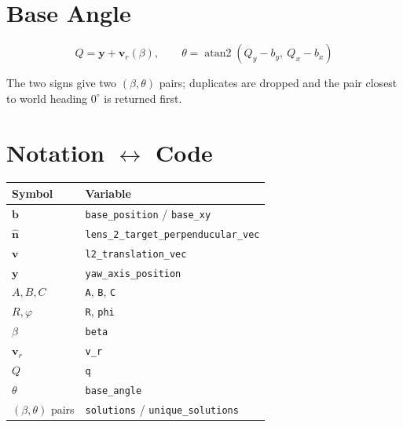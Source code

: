 \documentclass[11pt,a4paper]{article}
\begin{document}
\section{Base Angle}

\begin{equation}
Q = \mathbf y + \mathbf v_r(\beta), \qquad
\theta = \operatorname{atan2}(Q_y - b_y,\ Q_x - b_x)
\end{equation}

The two signs give two $(\beta,\theta)$ pairs; duplicates are dropped and the pair closest to
world heading $0^\circ$ is returned first.

\section{Notation $\leftrightarrow$ Code}

\begin{center}
\begin{tabular}{@{}ll@{}}
\toprule
Symbol & Variable \\
\midrule
$\mathbf b$ & \texttt{base\_position} / \texttt{base\_xy} \\
$\hat{\mathbf n}$ & \texttt{lens\_2\_target\_perpenducular\_vec} \\
$\mathbf v$ & \texttt{l2\_translation\_vec} \\
$\mathbf y$ & \texttt{yaw\_axis\_position} \\
$A,B,C$ & \texttt{A}, \texttt{B}, \texttt{C} \\
$R,\varphi$ & \texttt{R}, \texttt{phi} \\
$\beta$ & \texttt{beta} \\
$\mathbf v_r$ & \texttt{v\_r} \\
$Q$ & \texttt{q} \\
$\theta$ & \texttt{base\_angle} \\
$(\beta,\theta)$ pairs & \texttt{solutions} / \texttt{unique\_solutions} \\
\bottomrule
\end{tabular}
\end{center}
\end{document}
